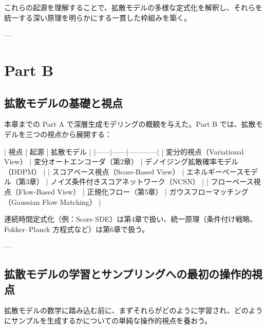 これらの起源を理解することで、拡散モデルの多様な定式化を解釈し、それらを統一する深い原理を明らかにする一貫した枠組みを築く。



---

\section*{Part B}


\subsection*{拡散モデルの基礎と視点}


本章までの Part A で深層生成モデリングの概観を与えた。Part B では、拡散モデルを三つの視点から展開する：

| 視点 | 起源 | 拡散モデル |
|------|------|------------|
| 変分的視点（Variational View） | 変分オートエンコーダ（第2章） | デノイジング拡散確率モデル（DDPM） |
| スコアベース視点（Score-Based View） | エネルギーベースモデル（第3章） | ノイズ条件付きスコアネットワーク（NCSN） |
| フローベース視点（Flow-Based View） | 正規化フロー（第5章） | ガウスフローマッチング（Gaussian Flow Matching） |

連続時間定式化（例：Score SDE）は第4章で扱い、統一原理（条件付け戦略、Fokker–Planck 方程式など）は第6章で扱う。

---

\subsection*{拡散モデルの学習とサンプリングへの最初の操作的視点}


拡散モデルの数学に踏み込む前に、まずそれらがどのように学習され、どのようにサンプルを生成するかについての単純な操作的視点を養おう。

